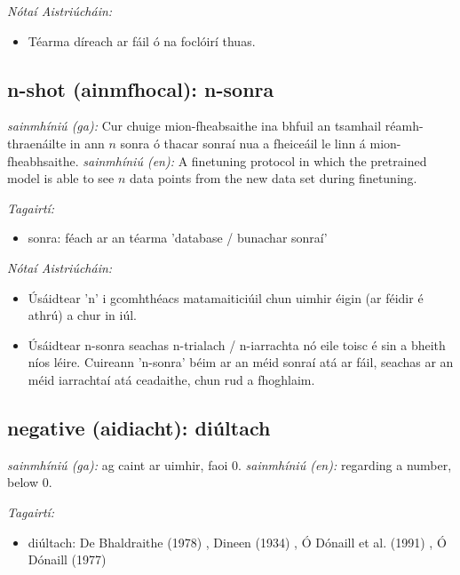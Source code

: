 \documentclass{article}
\begin{document}
 \noindent \textit{Nótaí Aistriúcháin:}
\begin{itemize}
	\item Téarma díreach ar fáil ó na foclóirí thuas.
\end{itemize}


\subsection*{n-shot (ainmfhocal): n-sonra} 
 \noindent \textit{sainmhíniú (ga):} Cur chuige mion-fheabsaithe ina bhfuil an tsamhail réamh-thraenáilte in ann $n$ sonra ó thacar sonraí nua a fheiceáil le linn á mion-fheabhsaithe.
\newline\newline
 \noindent \textit{sainmhíniú (en):} A finetuning protocol in which the pretrained model is able to see $n$ data points from the new data set during finetuning.
\newline

 \noindent \textit{Tagairtí:}
\begin{itemize}
	\item sonra: féach ar an téarma 'database / bunachar sonraí'
\end{itemize}

 \noindent \textit{Nótaí Aistriúcháin:}
\begin{itemize}
	\item Úsáidtear 'n' i gcomhthéacs matamaiticiúil chun uimhir éigin (ar féidir é athrú) a chur in iúl.
	\item Úsáidtear n-sonra seachas n-trialach / n-iarrachta nó eile toisc é sin a bheith níos léire. Cuireann 'n-sonra' béim ar an méid sonraí atá ar fáil, seachas ar an méid iarrachtaí atá ceadaithe, chun rud a fhoghlaim.
\end{itemize}


\subsection*{negative (aidiacht): diúltach} 
 \noindent \textit{sainmhíniú (ga):} ag caint ar uimhir, faoi 0.
\newline\newline
 \noindent \textit{sainmhíniú (en):} regarding a number, below 0.
\newline

 \noindent \textit{Tagairtí:}
\begin{itemize}
	\item diúltach: De Bhaldraithe (1978) \cite{de-bhaldraithe}, Dineen (1934) \cite{dineen}, Ó Dónaill et al. (1991) \cite{focloir-beag}, Ó Dónaill (1977) \cite{odonaill}
\end{itemize}
\end{document}
